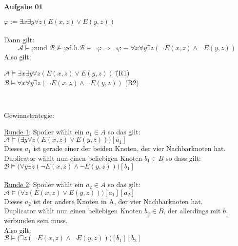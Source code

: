 \documentclass[a4paper,10pt]{article}
\begin{document}
	\parindent0pt
	\textbf{Aufgabe 01}
	\begin{compactenum} [(a)]
		\item $ \varphi := \exists x\exists y \forall z (E(x,z) \vee E(y,z))$\\\\
		Dann gilt: \[ \mathcal{A} \models \varphi \text{und } \mathcal{B} \not\models \varphi \text{d.h.} \mathcal{B} \models \lnot \varphi \Longrightarrow \lnot \varphi \equiv \forall x \forall y \exists z (\lnot E(x,z) \wedge \lnot E(y,z)) \]
		Also gilt:\\
		\begin{tabbing}
			$ \mathcal{A} \models \exists x\exists y \forall z (E(x,z) \vee E(y,z))$ \qquad \qquad \qquad \= (R1) \\
			$ \mathcal{B} \models \forall x \forall y \exists z (\lnot E(x,z) \wedge \lnot E(y,z)) $
			\> (R2)
		\end{tabbing} \
		
		Gewinnstrategie:\\
		\begin{tabbing}
			\underline{Runde 1}: \= Spoiler wählt ein $ a_1 \in A $ so das gilt:\\
			\> $ \mathcal{A} \models \big( \exists y \forall z (E(x,z) \vee E(y,z)) \big) [a_1] $\\
			\> Dieses $ a_1 $ ist gerade einer der beiden Knoten, der vier Nachbarknoten hat.\\
			\> Duplicator wählt nun einen beliebigen Knoten $ b_1 \in B$ so dass gilt:\\
			\> $ \mathcal{B} \models \big(\forall y \exists z (\lnot E(x,z) \wedge \lnot E(y,z))\big) [b_1] $\\\\

			\underline{Runde 2}: Spoiler wählt ein $ a_2 \in A$ so das gilt:\\
			\> $\mathcal{A} \models \big(\forall z (E(x,z) \vee E(y,z))\big) [a_1][a_2]$\\
			\> Dieses $ a_2 $ ist der andere Knoten in A, der vier Nachbarknoten hat.\\
			\> Duplicator wählt nun einen beliebigen Knoten $ b_2 \in B $, der allerdings mit $ b_1 $ verbunden sein muss.\\
			\> Also gilt:\\
			\> $ \mathcal{B} \models \big(\exists z (\lnot E(x,z) \wedge \lnot E(y,z))\big) [b_1][b_2] $\\\\
			

\end{tabbing}
\end{compactenum}
\end{document}
